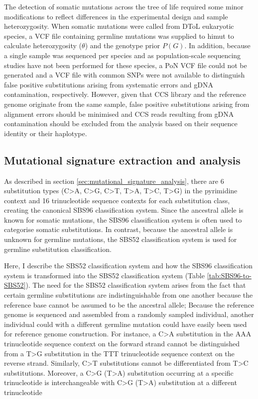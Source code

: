 The detection of somatic mutations across the tree of life required some minor modifications to reflect differences in the experimental design and sample heterozygosity. When somatic mutations were called from DToL eukaryotic species, a VCF file containing germline mutations was supplied to himut to calculate heterozygosity ($\theta$) and the genotype prior $P(G)$. In addition, because a single sample was sequenced per species and as population-scale sequencing studies have not been performed for these species, a PoN VCF file could not be generated and a VCF file with common SNPs were not available to distinguish false positive substitutions arising from systematic errors and gDNA contamination, respectively. However, given that CCS library and the reference genome originate from the same sample, false positive substitutions arising from alignment errors should be minimised and CCS reads resulting from gDNA contamination should be excluded from the analysis based on their sequence identity or their haplotype.

\subsection{Mutational signature extraction and analysis}


As described in section \ref{sec:mutational_signature_analysis}, there are 6 substitution types (C>A, C>G, C>T, T>A, T>C, T>G) in the pyrimidine context and 16 trinucleotide sequence contexts for each substitution class, creating the canonical SBS96 classification system. Since the ancestral allele is known for somatic mutations, the SBS96 classification system is often used to categorise somatic substitutions. In contrast, because the ancestral allele is unknown for germline mutations, the SBS52 classification system is used for germline substitution classification. 

Here, I describe the SBS52 classification system and how the SBS96 classification system is transformed into the SBS52 classification system (Table \ref{tab:SBS96-to-SBS52}). The need for the SBS52 classification system arises from the fact that certain germline substitutions are indistinguishable from one another because the reference base cannot be assumed to be the ancestral allele; Because the reference genome is sequenced and assembled from a randomly sampled individual, another individual could with a different germline mutation could have easily been used for reference genome construction. For instance, a C>A substitution in the AAA trinucleotide sequence context on the forward strand cannot be distinguished from a T>G substitution in the TTT trinucleotide sequence context on the reverse strand. Similarly, C>T substitutions cannot be differentiated from T>C substitutions. Moreover, a C>G (T>A) substitution occurring at a specific trinucleotide is interchangeable with C>G (T>A) substitution at a different trinucleotide

